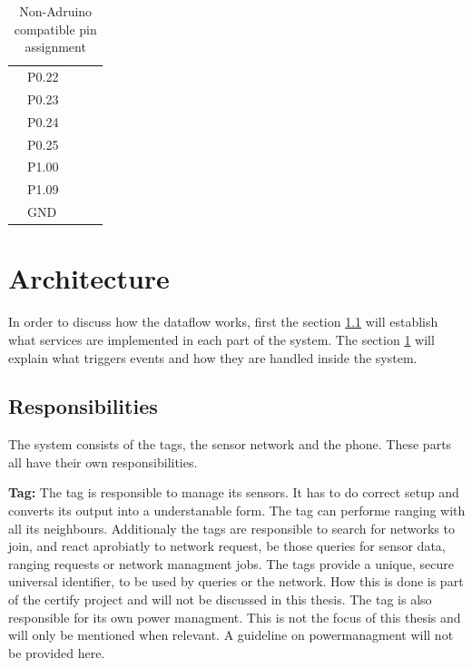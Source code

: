 \begin{table}[]
\begin{tabular}{l|l|l|l|l|}
		\multicolumn{1}{|l|}{} & P0.22  &               &             &             \\
		\multicolumn{1}{|l|}{} & P0.23  &               &             &             \\
		\multicolumn{1}{|l|}{} & P0.24  &               &             &             \\
		\multicolumn{1}{|l|}{} & P0.25  &               &             &             \\
		\multicolumn{1}{|l|}{} & P1.00  &               &             &             \\
		\multicolumn{1}{|l|}{} & P1.09  &               &             &             \\
		\multicolumn{1}{|l|}{} & GND    &               &             &             \\
		\hline
	\end{tabular}
\caption{Non-Adruino compatible pin assignment}
\label{table:otherPins}
\end{table}


\section{Architecture}
\label{ss:dataflow}

In order to discuss how the dataflow works, first the section \ref{ss:responsibility} will establish what services are implemented in each part of the system.
The section \ref{ss:dataflow} will explain what triggers events and how they are handled inside the system.

\subsection{Responsibilities}
\label{ss:responsibility}
The system consists of the tags, the sensor network and the phone.
These parts all have their own responsibilities.

\textbf{Tag:} 
The tag is responsible to manage its sensors. 
It has to do correct setup and converts its output into a understanable form.
The tag can performe ranging with all its neighbours.
Additionaly the tags are responsible to search for networks to join, and react aprobiatly to network request, be those queries for sensor data, ranging requests or network managment jobs. 
The tags provide a unique, secure universal identifier, to be used by queries or the network.
How this is done is part of the certify project and will not be discussed in this thesis.
The tag is also responsible for its own power managment.
This is not the focus of this thesis and will only be mentioned when relevant.
A guideline on powermanagment will not be provided here.

